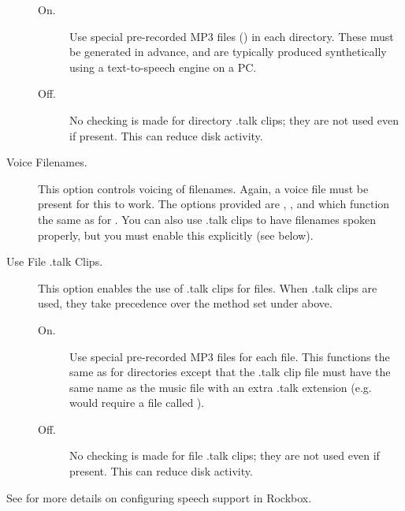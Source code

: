 \begin{description}
    \begin{description}
    \item[On.]
      Use special pre-recorded MP3 files () in each 
      directory. These must be generated in advance, and are typically 
      produced synthetically using a text-to-speech engine on a PC.
    \item[Off.]
      No checking is made for directory .talk clips; they are not used even if present.
      This can reduce disk activity.
    \end{description}

  \item[Voice Filenames.]
    This option controls voicing of filenames. Again, a voice file must be present 
    for this to work. The options provided are , , 
    and  which function the same as for .
    You can also use .talk clips to have filenames spoken properly, but you must
    enable this explicitly (see below).

  \item[Use File .talk Clips.]
    This option enables the use of .talk clips for files. When .talk clips are used,
    they take precedence over the method set under  
    above.
    \begin{description}
    \item[On.]
      Use special pre-recorded MP3 files for each file.
      This functions the same as for directories except that the .talk clip file 
      must have the same name as the music file with an extra .talk extension 
      (e.g.  would require a file called ).
    \item[Off.]
      No checking is made for file .talk clips; they are not used even if present.
      This can reduce disk activity.
    \end{description}

  \end{description}

See  for more details on configuring speech support in Rockbox.
